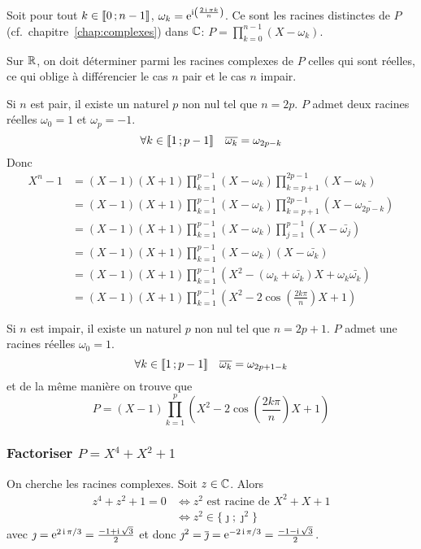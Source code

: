 Soit pour tout \(k \in \mathopen{\llbracket}0\mathclose{}\mathpunct{};n-1\mathclose{\rrbracket}\), \(\omega_k =
\operatorname{e}^{\operatorname{i}\left(\frac{2\operatorname{i} \pi k}{n}\right)}\). Ce sont les racines distinctes de
\(P\) (cf.\ chapitre~\ref{chap:complexes}) dans \(\mathbb{C}\): \(P = \prod_{k = 0}^{n-1}(X-\omega_k)\).

Sur \(\mathbb{R}\), on doit déterminer parmi les racines complexes de \(P\) celles qui
sont réelles, ce qui oblige à différencier le cas \(n\) pair et le cas \(n\)
impair.

Si \(n\) est pair, il existe un naturel \(p\) non nul tel que \(n = 2p\). \(P\)
admet deux racines réelles \(\omega_0 = 1\) et \(\omega_p = -1\).
\begin{equation}
  \forall k \in \mathopen{\llbracket}1\mathclose{}\mathpunct{};p-1\mathclose{\rrbracket} \quad \overline{\omega_k} = \omega_{2p-k}
\end{equation}
Donc
\begin{align}
  X^n-1 &= (X-1)(X+1) \prod_{k = 1}^{p-1} (X-\omega_k)\prod_{k = p+1}^{2p-1}
  (X-\omega_k) \\
  & = (X-1)(X+1) \prod_{k = 1}^{p-1} (X-\omega_k) \prod_{k = p+1}^{2p-1}
  (X-\bar{\omega_{2p-k}})\\
  & = (X-1)(X+1) \prod_{k = 1}^{p-1} (X-\omega_k) \prod_{j = 1}^{p-1}
  (X-\bar{\omega_{j}})\\
  & = (X-1)(X+1) \prod_{k = 1}^{p-1} (X-\omega_k)(X-\bar{\omega_{k}})\\
  & = (X-1)(X+1) \prod_{k = 1}^{p-1}
  (X^2-(\omega_k+\bar{\omega_k})X+\omega_k\bar{\omega_k})\\
  & = (X-1)(X+1) \prod_{k = 1}^{p-1}
  \left(X^2-2\cos\left(\frac{2k\pi}{n}\right)X+1\right)
\end{align}

Si \(n\) est impair, il existe un naturel \(p\) non nul tel que \(n = 2p+1\).
\(P\) admet une racines réelles \(\omega_0 = 1\).
\begin{equation}
  \forall k \in \mathopen{\llbracket}1\mathclose{}\mathpunct{};p-1\mathclose{\rrbracket} \quad \overline{\omega_k} = \omega_{2p+1-k}
\end{equation}
et de la même manière on trouve que
\begin{equation}
  P = (X-1) \prod_{k = 1}^{p} \left(X^2-2\cos\left(\frac{2k\pi}{n}\right)X+1\right)
\end{equation}

\subsubsection{Factoriser \(P = X^4+X^2+1\)}

On cherche les racines complexes. Soit \(z \in \mathbb{C}\). Alors
\begin{align}
  z^4+z^2+1 = 0 &\iff z^2 \text{~est racine de~} X^2+X+1 \\
  &\iff z^2 \in \{\jmath ; \jmath^2\}
\end{align}
avec \(\jmath = \operatorname{e}^{2\operatorname{i}\pi/3} = \frac{-1+\operatorname{i}\sqrt{3}}{2}\) et donc
\(\jmath^2 = \overline{\jmath} = \operatorname{e}^{-2\operatorname{i}\pi/3} = \frac{-1-\operatorname{i}\sqrt{3}}{2}\).


